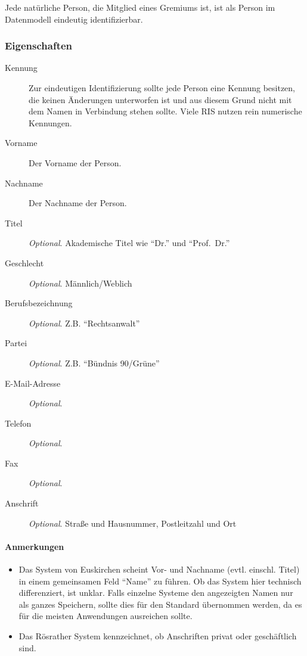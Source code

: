 Jede natürliche Person, die Mitglied eines Gremiums ist, ist als Person
im Datenmodell eindeutig identifizierbar.

\subsubsection{Eigenschaften}

\begin{description}
\item[Kennung]
Zur eindeutigen Identifizierung sollte jede Person eine Kennung
besitzen, die keinen Änderungen unterworfen ist und aus diesem Grund
nicht mit dem Namen in Verbindung stehen sollte. Viele RIS nutzen rein
numerische Kennungen.
\item[Vorname]
Der Vorname der Person.
\item[Nachname]
Der Nachname der Person.
\item[Titel]
\emph{Optional}. Akademische Titel wie ``Dr.'' und ``Prof.~Dr.''
\item[Geschlecht]
\emph{Optional}. Männlich/Weblich
\item[Berufsbezeichnung]
\emph{Optional}. Z.B. ``Rechtsanwalt''
\item[Partei]
\emph{Optional}. Z.B. ``Bündnis 90/Grüne''
\item[E-Mail-Adresse]
\emph{Optional}.
\item[Telefon]
\emph{Optional}.
\item[Fax]
\emph{Optional}.
\item[Anschrift]
\emph{Optional}. Straße und Hausnummer, Postleitzahl und Ort
\end{description}

\paragraph{Anmerkungen}

\begin{itemize}
\item
  Das System von Euskirchen scheint Vor- und Nachname (evtl. einschl.
  Titel) in einem gemeinsamen Feld ``Name'' zu führen. Ob das System
  hier technisch differenziert, ist unklar. Falls einzelne Systeme den
  angezeigten Namen nur als ganzes Speichern, sollte dies für den
  Standard übernommen werden, da es für die meisten Anwendungen
  ausreichen sollte.
\item
  Das Rösrather System kennzeichnet, ob Anschriften privat oder
  geschäftlich sind.
\end{itemize}

